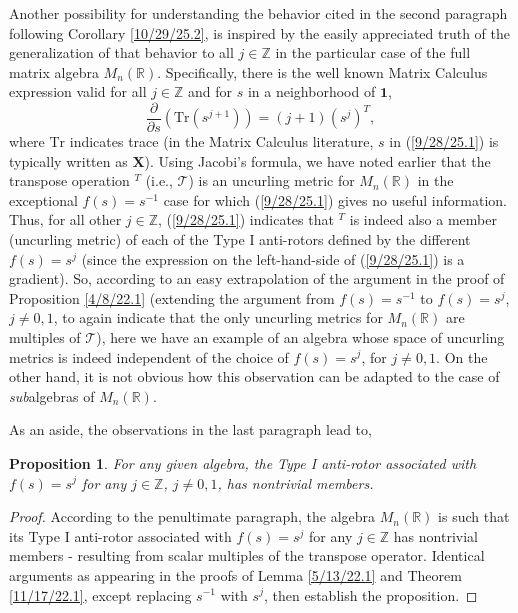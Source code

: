 \documentclass{amsart}
\newtheorem{proposition}[theorem]{Proposition}
\theoremstyle{definition}
\numberwithin{theorem}{section}
\numberwithin{equation}{section}
\begin{document}
Another possibility for understanding the behavior cited in the second paragraph following Corollary \ref{10/29/25.2}, is inspired by the easily appreciated truth of the generalization of that behavior to all $j\in\mathbb{Z}$ in the particular case of the full matrix algebra $M_n(\mathbb{R})$.  
Specifically, there is the well known Matrix Calculus expression valid for all $j\in\mathbb{Z}$ and for $s$ in a neighborhood of $\mathbf{1}$, \begin{equation}\label{9/28/25.1} \frac{\partial}{\partial s}\left(\text{Tr}(s^{j+1})\right) = (j+1)\left(s^j\right)^T,\end{equation} where $\text{Tr}$ indicates trace (in the Matrix Calculus literature, $s$ in (\ref{9/28/25.1}) is typically written as $\mathbf{X}$). Using Jacobi's formula, we have noted earlier that the transpose operation $^T$ (i.e., $\mathcal{T}$) is an uncurling metric for $M_n(\mathbb{R})$ in the exceptional $f(s)=s^{-1}$ case for which (\ref{9/28/25.1}) gives no useful information. Thus, for all other $j\in\mathbb{Z}$, (\ref{9/28/25.1}) indicates that $^T$ is indeed also a member (uncurling metric) of each of the Type I anti-rotors defined by the different $f(s)=s^j$ (since the expression on the left-hand-side of (\ref{9/28/25.1}) is a gradient).  So, according to an easy extrapolation of the argument in the proof of Proposition \ref{4/8/22.1} (extending the argument from $f(s)=s^{-1}$ to $f(s)=s^j$, $j\ne 0,1$, to again indicate that the only uncurling metrics for $M_n(\mathbb{R})$ are multiples of $\mathcal{T}$), here we have an example of an algebra whose space of uncurling metrics is indeed independent of the choice of $f(s)=s^j$, for $j\ne 0,1$.  On the other hand, it is not obvious how this observation can be adapted to the case of {\it sub}algebras of $M_n(\mathbb{R})$.  

As an aside, the observations in the last paragraph lead to,
\begin{proposition} \label{10/25/25.5}  For any given algebra, the Type I anti-rotor associated with $f(s)=s^j$ for any $j\in\mathbb{Z}$, $j\ne 0,1$, has nontrivial members.\end{proposition}
\begin{proof}
 According to the penultimate paragraph, the algebra $M_n(\mathbb{R})$ is such that its Type I anti-rotor associated with $f(s)=s^j$ for any $j\in\mathbb{Z}$ has nontrivial members - resulting from scalar multiples of the transpose operator. Identical arguments as appearing in the proofs of Lemma \ref{5/13/22.1} and Theorem \ref{11/17/22.1}, except replacing $s^{-1}$ with $s^j$, then establish the proposition.\end{proof}
\end{document}
